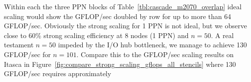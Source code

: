 Within each the three PPN blocks of Table~\ref{tbl:cascade_m2070_overlap} ideal scaling would show the GFLOP/sec doubled by row for up to more than 64 GFLOP/sec. Obviously the strong scaling for 1 PPN is not ideal, but we observe close to 60\% strong scaling efficiency at 8 nodes (1 PPN) and $n=50$. A real testament  $n=50$ impeded by the I/O hub bottleneck, we manage to achieve 130 GFLOP/sec for $n=101$. Compare this to the GFLOP/sec scaling results on Itasca in Figure~\ref{fig:compare_strong_scaling_gflops_all_stencils} where 130 GFLOP/sec requires approximately 

%
%
%

